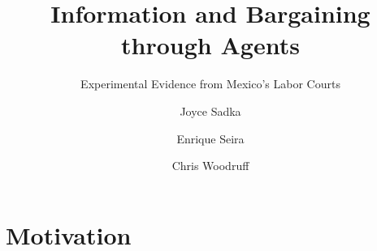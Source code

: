 \documentclass[9pt]{beamer}
\title{Information and Bargaining through Agents}
\subtitle{Experimental Evidence from Mexico's Labor Courts}
\author{Joyce Sadka\inst{1} \and Enrique Seira\inst{2} \and Chris Woodruff\inst{3}}
\institute[ITAM, Oxford] %
{
  \inst{1,2}%
  Instituto Tecnologico Autonomo de Mexico
  \and
  \inst{3}%
  Oxford University
}
\date{}
\begin{document}
\begin{frame}
  \titlepage
\end{frame}


%    
%      

\section{Motivation}
\end{document}

